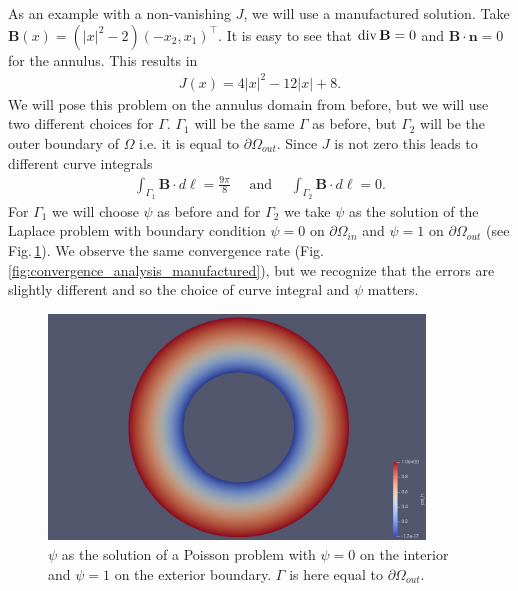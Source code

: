 \documentclass[../master_thesis.tex]{subfiles}
\begin{document}
As an example with a non-vanishing $J$, we will use a manufactured solution. 
Take $\mathbf{B}(x) = (|x|^2 -2) (-x_2,x_1)^\top$. It is easy to see that 
$\operatorname{div} \mathbf{B} = 0$ and 
$\mathbf{B}\cdot \mathbf{n} = 0$ for the annulus. 
This results in   
\begin{align*}
    J(x) = 4 |x|^2 - 12 |x| + 8.
\end{align*}
We will pose this problem on the annulus domain from before, but we will use two 
different choices for $\Gamma$. 
$\Gamma_1$ will be the same $\Gamma$ as before, but $\Gamma_2$ will 
be the outer boundary of $\Omega$ i.e. 
it is equal to $\partial\Omega_{out}$. 
Since $J$ is not zero this leads to different curve integrals
\begin{align*}
    \int_{\Gamma_1} \mathbf{B}\cdot d\ell = \frac{9\pi}{8} \quad \text{  and  } \quad
    \int_{\Gamma_2} \mathbf{B}\cdot d\ell = 0.
\end{align*}
For $\Gamma_1$ we will choose $\psi$ as before and for $\Gamma_2$ we take
$\psi$ as the solution of the Laplace problem with boundary condition 
$\psi=0$ on $\partial\Omega_{in}$ and $\psi=1$ on $\partial\Omega_{out}$
(see Fig.\,\ref{fig:psi_poisson}). We observe the same convergence rate 
(Fig.\,\ref{fig:convergence_analysis_manufactured}), but we recognize that 
the errors are slightly different and so the choice of curve integral and 
$\psi$ matters.

\begin{figure}
    \centering 
    \includegraphics[width=10cm]{plot_files/manufactured_poisson_psi/psi_h.png}
    \caption{$\psi$ as the solution of a Poisson problem with $\psi=0$ 
    on the interior and $\psi = 1$ on the exterior boundary. $\Gamma$ 
    is here equal to $\partial \Omega_{out}$.}
    \label{fig:psi_poisson}
\end{figure}
\end{document}
